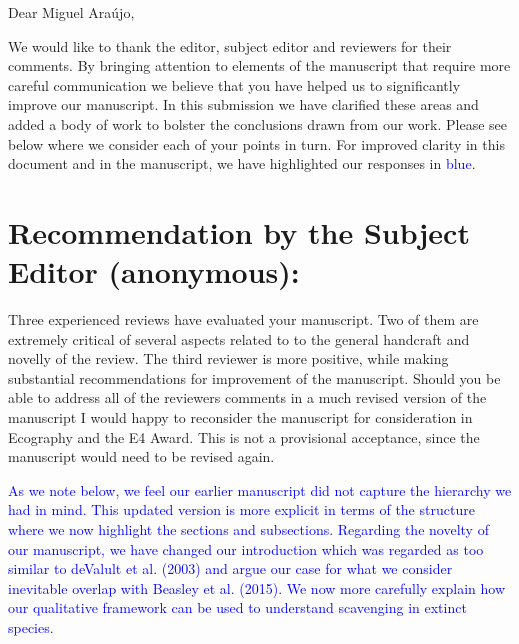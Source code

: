 \documentclass[12pt,letterpaper]{article}
\begin{document}
Dear Miguel Ara\'{u}jo,

\bigskip

We would like to thank the editor, subject editor and reviewers for their comments. By bringing attention to elements of the manuscript that require more careful communication we believe that you have helped us to significantly improve our manuscript. In this submission we have clarified these areas and added a body of work to bolster the conclusions drawn from our work. Please see below where we consider each of your points in turn.
For improved clarity in this document and in the manuscript, we have highlighted our responses in \textcolor{blue}{blue}.

\section{Recommendation by the Subject Editor (anonymous):}
Three experienced reviews have evaluated your manuscript.
Two of them are extremely critical of several aspects related to to the general handcraft and novelly of the review.
The third reviewer is more positive, while making substantial recommendations for improvement of the manuscript.
Should you be able to address all of the reviewers comments in a much revised version of the manuscript I would happy to reconsider the manuscript for consideration in Ecography and the E4 Award.
This is not a provisional acceptance, since the manuscript would need to be revised again.

\smallskip

\textcolor{blue}{As we note below, we feel our earlier manuscript did not capture the hierarchy we had in mind.
This updated version is more explicit in terms of the structure where we now highlight the sections and subsections.
Regarding the novelty of our manuscript, we have changed our introduction which was regarded as too similar to deValult et al. (2003) and argue our case for what we consider inevitable overlap with Beasley et al. (2015).
We now more carefully explain how our qualitative framework can be used to understand scavenging in extinct species.} 
\end{document}

